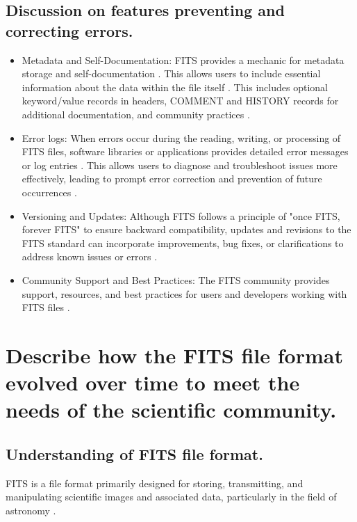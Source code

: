 \documentclass[a4paper,oneside,11pt]{book}
\begin{document}
\subsection{Discussion on features preventing and correcting errors.}
\begin{itemize}
    \item Metadata and Self-Documentation: FITS provides a mechanic for metadata storage and self-documentation \citep{fits_3}. This allows users to include essential information about the data within the file itself \citep{fits_3}. This includes optional keyword/value records in headers, COMMENT and HISTORY records for additional documentation, and community practices \citep{fits_3}.
    \item Error logs: When errors occur during the reading, writing, or processing of FITS files, software libraries or applications provides detailed error messages or log entries \citep{fits_3}. This allows users to diagnose and troubleshoot issues more effectively, leading to prompt error correction and prevention of future occurrences \citep{fits_3}.
    \item Versioning and Updates: Although FITS follows a principle of "once FITS, forever FITS" to ensure backward compatibility, updates and revisions to the FITS standard can incorporate improvements, bug fixes, or clarifications to address known issues or errors \citep{fits_3}.
    \item Community Support and Best Practices: The FITS community provides support, resources, and best practices for users and developers working with FITS files \citep{fits_3}.
\end{itemize}
\section{Describe how the FITS file format evolved over time to meet the needs of the scientific community.}
\subsection{Understanding of FITS file format.}
FITS is a file format primarily designed for storing, transmitting, and manipulating scientific images and associated data, particularly in the field of astronomy \cite{fits_3}.
\end{document}
